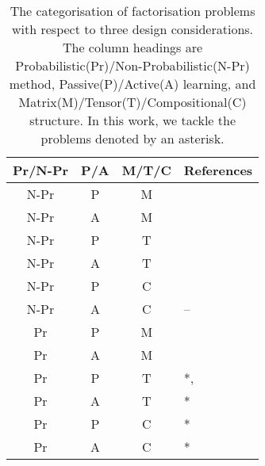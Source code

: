 
\begin{table}[t]
\centering
\caption{\label{tbl:relatedwork}The categorisation of factorisation problems with respect to 
three design considerations. The column headings are Probabilistic(Pr)/Non-Probabilistic(N-Pr) method, Passive(P)/Active(A) learning, and Matrix(M)/Tensor(T)/Compositional(C) structure. In this work, we tackle the problems denoted by an asterisk.}
\vskip 0.15in
\small
\begin{tabular}{c c c l}
Pr/N-Pr & P/A & M/T/C & References	\\ \hline \hline

N-Pr & P & M & \cite{lee1999learning}\\ \hline
N-Pr & A & M & \cite{ruchansky2015matrix}\\  \hline

N-Pr & P & T& \cite{nickel2011three}\cite{kolda2009tensor}\\ \hline
N-Pr & A & T & \cite{kajino2015active} \\  \hline
N-Pr & P & C & \cite{Neelakantan2015}\cite{guu2015traversing}\\ \hline
N-Pr & A & C & -- \\ \hline
Pr & P & M & \cite{mnih2007probabilistic}\\ \hline
Pr & A & M&  \cite{kawale2015efficient}\cite{sutherland2013active}\\ \hline

Pr & P & T& *, \cite{xiong2010temporal}\cite{schmidt2009probabilistic} \\ \hline
Pr & A & T & * \\ \hline
Pr & P & C & * \\ \hline
Pr & A & C & *
\end{tabular}
\end{table}